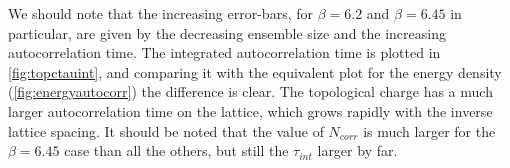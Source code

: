 We should note that the increasing error-bars, for $\beta = 6.2$ and $\beta = 6.45$ in particular, are given by the decreasing ensemble size and the increasing autocorrelation time. The integrated autocorrelation time is plotted in \cref{fig:topctauint}, and comparing it with the equivalent plot for the energy density (\cref{fig:energyautocorr}) the difference is clear. The topological charge has a much larger autocorrelation time on the lattice, which grows rapidly with the inverse lattice spacing. It should be noted that the value of $N_{corr}$ is much larger for the $\beta=6.45$ case than all the others, but still the $\tau_{int}$ larger by far.

